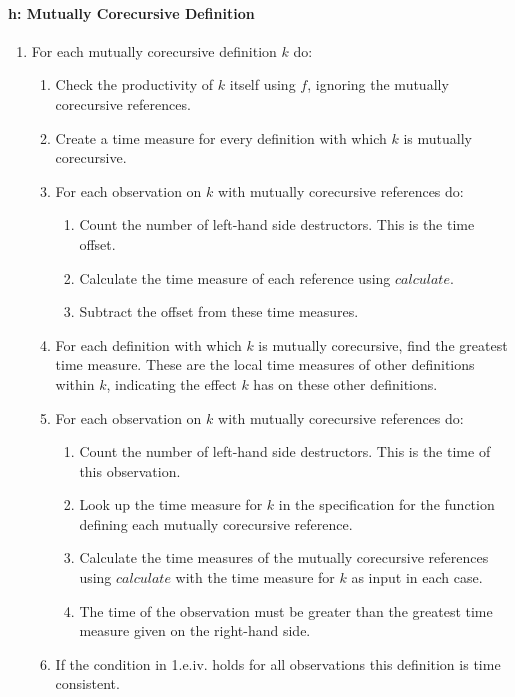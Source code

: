 \paragraph{h: Mutually Corecursive Definition}
\begin{enumerate}
\item For each mutually corecursive definition $k$ do:
\begin{enumerate}
\item Check the productivity of $k$ itself using $f$, ignoring the mutually corecursive references.
\item Create a time measure for every definition with which $k$ is mutually corecursive.
\item For each observation on $k$ with mutually corecursive references do:
\begin{enumerate}
\item Count the number of left-hand side destructors. This is the time offset.
\item Calculate the time measure of each reference using $calculate$.
\item Subtract the offset from these time measures.
\end{enumerate}
\item For each definition with which $k$ is mutually corecursive, find the greatest time measure. These are the local time measures of other definitions within $k$, indicating the effect $k$ has on these other definitions.
\item For each observation on $k$ with mutually corecursive references do:
\begin{enumerate}
\item Count the number of left-hand side destructors. This is the time of this observation.
\item Look up the time measure for $k$ in the specification for the function defining each mutually corecursive reference.
\item Calculate the time measures of the mutually corecursive references using $calculate$ with the time measure for $k$ as input in each case.
\item The time of the observation must be greater than the greatest time measure given on the right-hand side.
\end{enumerate}
\item If the condition in 1.e.iv. holds for all observations this definition is time consistent.
\end{enumerate}
\end{enumerate}

